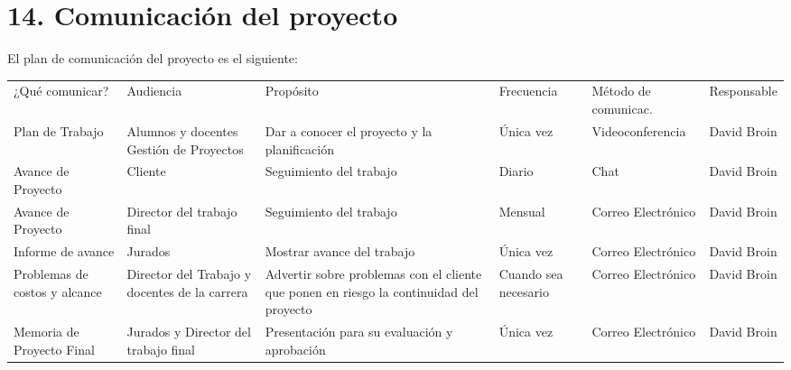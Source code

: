 \documentclass[11pt]{charter}
\begin{document}
\section{14. Comunicación del proyecto}
\label{sec:comunicaciones}

El plan de comunicación del proyecto es el siguiente:

\begin{table}[htpb]
  \centering
  \begin{tabularx}{\linewidth}{@{}|X|C{2.4cm}|C{3cm}|C{1.8cm}|C{2cm}|C{2.1cm}|@{}}
  \hline
             \\ \hline
  ¿Qué comunicar? & Audiencia & Propósito & Frecuencia & Método de comunicac. & Responsable \\ \hline
  Plan de Trabajo               & Alumnos y docentes \newline Gestión de Proyectos & Dar a conocer el proyecto y la planificación                                            & Única vez            & Videoconferencia     & David Broin \\ \hline
  Avance de Proyecto            & Cliente                                                                            & Seguimiento del trabajo                                                                 & Diario               & Chat                 & David Broin \\ \hline
  Avance de Proyecto            & Director del trabajo final                                                         & Seguimiento del trabajo                                                                 & Mensual              & Correo Electrónico   & David Broin \\ \hline
  Informe de avance             & Jurados                                                                            & Mostrar avance del trabajo                                                              & Única vez            & Correo Electrónico   & David Broin \\ \hline
  Problemas de costos y alcance & Director del Trabajo y docentes de la carrera                                      & Advertir sobre problemas con el cliente que ponen en riesgo la continuidad del proyecto & Cuando sea necesario & Correo Electrónico   & David Broin \\ \hline
  Memoria de Proyecto Final     & Jurados y Director del trabajo final                                               & Presentación para su evaluación y aprobación                                            & Única vez            & Correo Electrónico   & David Broin \\ \hline
  \end{tabularx}
\end{table}
\end{document}

